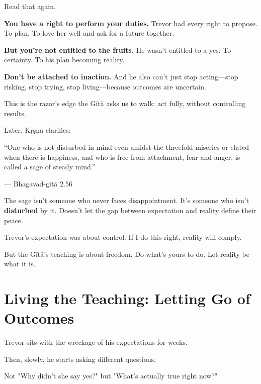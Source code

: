 \documentclass[11pt,twoside]{book}
\begin{document}
Read that again.

\textbf{\textbf{You have a right to perform your duties.}} Trevor had every right to propose. To plan. To love her well and ask for a future together.

\textbf{\textbf{But you're not entitled to the fruits.}} He wasn't entitled to a yes. To certainty. To his plan becoming reality.

\textbf{\textbf{Don't be attached to inaction.}} And he also can't just stop acting—stop risking, stop trying, stop living—because outcomes are uncertain.

This is the razor's edge the Gītā asks us to walk: act fully, without controlling results.

Later, Kṛṣṇa clarifies:

\begin{pullquote}
``One who is not disturbed in mind even amidst the threefold miseries or elated when there is happiness, and who is free from attachment, fear and anger, is called a sage of steady mind.''

--- Bhagavad-gītā 2.56
\end{pullquote}

The sage isn't someone who never faces disappointment. It's someone who isn't \textbf{disturbed} by it. Doesn't let the gap between expectation and reality define their peace.

Trevor's expectation was about control. If I do this right, reality will comply.

But the Gītā's teaching is about freedom. Do what's yours to do. Let reality be what it is.

\section*{Living the Teaching: Letting Go of Outcomes}

Trevor sits with the wreckage of his expectations for weeks.

Then, slowly, he starts asking different questions.

Not "Why didn't she say yes?" but "What's actually true right now?"
\end{document}
